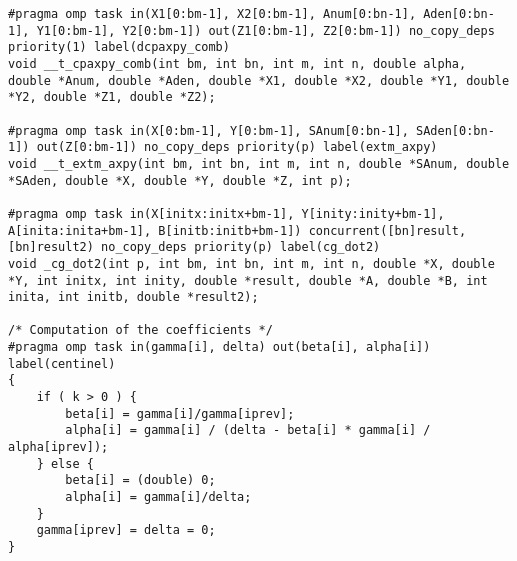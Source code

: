 \begin{appendices}
\begin{lstlisting}
#pragma omp task in(X1[0:bm-1], X2[0:bm-1], Anum[0:bn-1], Aden[0:bn-1], Y1[0:bm-1], Y2[0:bm-1]) out(Z1[0:bm-1], Z2[0:bm-1]) no_copy_deps priority(1) label(dcpaxpy_comb)
void __t_cpaxpy_comb(int bm, int bn, int m, int n, double alpha, double *Anum, double *Aden, double *X1, double *X2, double *Y1, double *Y2, double *Z1, double *Z2);

#pragma omp task in(X[0:bm-1], Y[0:bm-1], SAnum[0:bn-1], SAden[0:bn-1]) out(Z[0:bm-1]) no_copy_deps priority(p) label(extm_axpy)
void __t_extm_axpy(int bm, int bn, int m, int n, double *SAnum, double *SAden, double *X, double *Y, double *Z, int p);

#pragma omp task in(X[initx:initx+bm-1], Y[inity:inity+bm-1], A[inita:inita+bm-1], B[initb:initb+bm-1]) concurrent([bn]result, [bn]result2) no_copy_deps priority(p) label(cg_dot2)
void _cg_dot2(int p, int bm, int bn, int m, int n, double *X, double *Y, int initx, int inity, double *result, double *A, double *B, int inita, int initb, double *result2);

/* Computation of the coefficients */
#pragma omp task in(gamma[i], delta) out(beta[i], alpha[i]) label(centinel) 
{
    if ( k > 0 ) {
        beta[i] = gamma[i]/gamma[iprev];
        alpha[i] = gamma[i] / (delta - beta[i] * gamma[i] / alpha[iprev]);
    } else {
        beta[i] = (double) 0;
        alpha[i] = gamma[i]/delta;
    }
    gamma[iprev] = delta = 0;
}  
\end{lstlisting}
\end{appendices}

